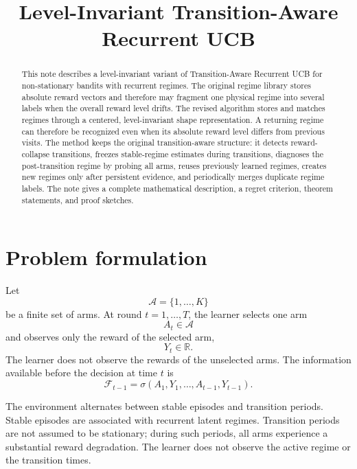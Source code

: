\documentclass[11pt]{article}
\title{Level-Invariant Transition-Aware Recurrent UCB}
\author{}
\date{}
\newcommand{\A}{\mathcal A}
\newcommand{\F}{\mathcal F}
\newcommand{\R}{\mathbb R}
\begin{document}
\maketitle

\begin{abstract}
This note describes a level-invariant variant of Transition-Aware Recurrent UCB for non-stationary bandits with recurrent regimes. The original regime library stores absolute reward vectors and therefore may fragment one physical regime into several labels when the overall reward level drifts. The revised algorithm stores and matches regimes through a centered, level-invariant shape representation. A returning regime can therefore be recognized even when its absolute reward level differs from previous visits. The method keeps the original transition-aware structure: it detects reward-collapse transitions, freezes stable-regime estimates during transitions, diagnoses the post-transition regime by probing all arms, reuses previously learned regimes, creates new regimes only after persistent evidence, and periodically merges duplicate regime labels. The note gives a complete mathematical description, a regret criterion, theorem statements, and proof sketches.
\end{abstract}

\section{Problem formulation}
\label{sec:problem_formulation}

Let
\begin{equation}
\label{eq:arm_set}
\A=\{1,\ldots,K\}
\end{equation}
be a finite set of arms. At round $t=1,\ldots,T$, the learner selects one arm
\begin{equation}
\label{eq:selected_arm}
A_t\in\A
\end{equation}
and observes only the reward of the selected arm,
\begin{equation}
\label{eq:observed_reward}
Y_t\in\R .
\end{equation}
The learner does not observe the rewards of the unselected arms. The information available before the decision at time $t$ is
\begin{equation}
\label{eq:filtration}
\F_{t-1}
=
\sigma(A_1,Y_1,\ldots,A_{t-1},Y_{t-1}).
\end{equation}

The environment alternates between stable episodes and transition periods. Stable episodes are associated with recurrent latent regimes. Transition periods are not assumed to be stationary; during such periods, all arms experience a substantial reward degradation. The learner does not observe the active regime or the transition times.
\end{document}
